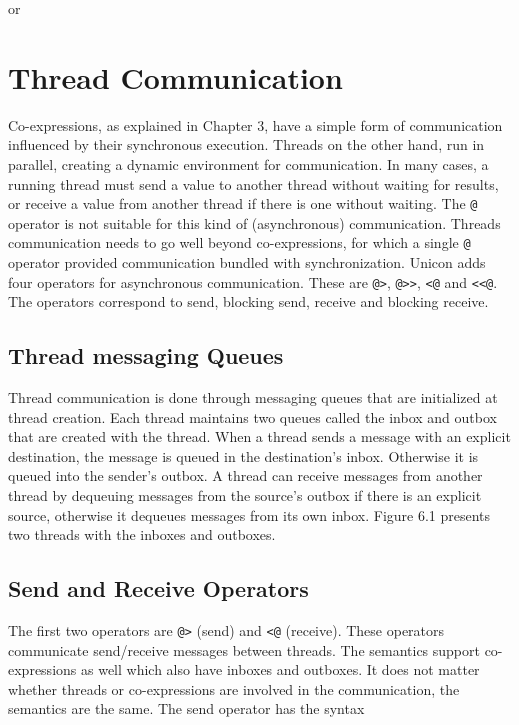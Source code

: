 \noindent or

\section{Thread Communication}
Co-expressions, as explained in {\color{red} Chapter 3}, have a simple form
of communication influenced by their synchronous execution. Threads on the
other hand, run in parallel, creating a dynamic environment for
communication. In many cases, a running thread must send a value to another
thread without waiting for results, or receive a value from another thread
if there is one without waiting. The \texttt{@} operator is not suitable
for this kind of (asynchronous) communication. Threads communication needs
to go well beyond co-expressions, for which a single \texttt{@} operator
provided communication bundled with synchronization. Unicon adds four
operators for asynchronous communication. These are \texttt{@>},
\texttt{@>{}>}, \texttt{<@} and \texttt{<{}<@}. The operators correspond to
send, blocking send, receive and blocking receive.

\subsection{Thread messaging Queues}
Thread communication is done through messaging queues that are initialized at thread
creation. Each thread maintains two queues called the inbox and outbox that are created
with the thread. When a thread sends a message with an explicit destination, the message
is queued in the destination's inbox. Otherwise it is queued into the sender's outbox.
A thread can receive messages from another thread by dequeuing messages from the source's
outbox if there is an explicit source, otherwise it dequeues messages from its own inbox.
{\color{red} Figure 6.1} presents two threads with the inboxes and outboxes. 

\subsection{Send and Receive Operators}
The first two operators are \texttt{@>} (send) and \texttt{<@}
(receive). These operators communicate send/receive messages between
threads. The semantics support co-expressions as well which also have
inboxes and outboxes. It does not matter whether threads or co-expressions
are involved in the communication, the semantics are the same. The send
operator has the syntax

